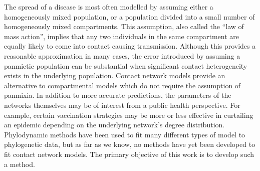 The spread of a disease is most often modelled by assuming either a
homogeneously mixed population, or a population divided into a small number of
homogeneously mixed compartments. This assumption, also called the ``law of
mass action'', implies that any two individuals in the same compartment are
equally likely to come into contact causing transmission. Although this
provides a reasonable approximation in many cases, the error introduced by
assuming a panmictic population can be substantial when significant contact
heterogeneity exists in the underlying population. Contact network models
provide an alternative to compartmental models which do not require the
assumption of panmixia. In addition to more accurate predictions, the
parameters of the networks themselves may be of interest from a public health
perspective. For example, certain vaccination strategies may be more or less
effective in curtailing an epidemic depending on the underlying network's
degree distribution. Phylodynamic methods have been used to fit many different
types of model to phylogenetic data, but as far as we know, no methods have yet
been developed to fit contact network models. The primary objective of this
work is to develop such a method.

\newcommand{\G}{\mathcal{G}}
\newcommand{\Nu}{\mathcal{N}}

